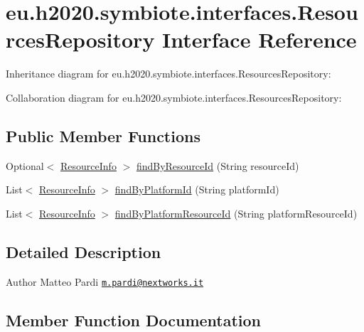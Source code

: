 \hypertarget{interfaceeu_1_1h2020_1_1symbiote_1_1interfaces_1_1ResourcesRepository}{}\section{eu.\+h2020.\+symbiote.\+interfaces.\+Resources\+Repository Interface Reference}
\label{interfaceeu_1_1h2020_1_1symbiote_1_1interfaces_1_1ResourcesRepository}


Inheritance diagram for eu.\+h2020.\+symbiote.\+interfaces.\+Resources\+Repository\+:


Collaboration diagram for eu.\+h2020.\+symbiote.\+interfaces.\+Resources\+Repository\+:
\subsection*{Public Member Functions}
\begin{DoxyCompactItemize}
\item 
Optional$<$ \hyperlink{classeu_1_1h2020_1_1symbiote_1_1resources_1_1ResourceInfo}{Resource\+Info} $>$ \hyperlink{interfaceeu_1_1h2020_1_1symbiote_1_1interfaces_1_1ResourcesRepository_a8dbe7b5a525d899cb06a669e3bec3c36}{find\+By\+Resource\+Id} (String resource\+Id)
\item 
List$<$ \hyperlink{classeu_1_1h2020_1_1symbiote_1_1resources_1_1ResourceInfo}{Resource\+Info} $>$ \hyperlink{interfaceeu_1_1h2020_1_1symbiote_1_1interfaces_1_1ResourcesRepository_af9aed383a759612e62374e2f123ec5d0}{find\+By\+Platform\+Id} (String platform\+Id)
\item 
List$<$ \hyperlink{classeu_1_1h2020_1_1symbiote_1_1resources_1_1ResourceInfo}{Resource\+Info} $>$ \hyperlink{interfaceeu_1_1h2020_1_1symbiote_1_1interfaces_1_1ResourcesRepository_ac711b7417029b7f94a9d68e9dbb6df94}{find\+By\+Platform\+Resource\+Id} (String platform\+Resource\+Id)
\end{DoxyCompactItemize}


\subsection{Detailed Description}
\begin{DoxyAuthor}{Author}
Matteo Pardi \href{mailto:m.pardi@nextworks.it}{\tt m.\+pardi@nextworks.\+it} 
\end{DoxyAuthor}


\subsection{Member Function Documentation}
\mbox{\label{interfaceeu_1_1h2020_1_1symbiote_1_1interfaces_1_1ResourcesRepository_af9aed383a759612e62374e2f123ec5d0}} 
